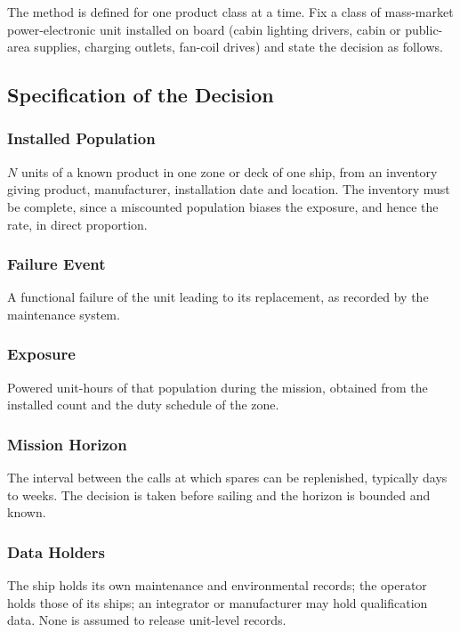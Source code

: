 The method is defined for one product class at a time. Fix a class of
mass-market power-electronic unit installed on board (cabin lighting drivers,
cabin or public-area supplies, charging outlets, fan-coil drives) and state
the decision as follows.

\subsection{Specification of the Decision}
\subsubsection{Installed Population}
$N$ units of a known product in one zone or deck of
one ship, from an inventory giving product, manufacturer, installation date and
location. The inventory must be complete, since a miscounted population biases the
exposure, and hence the rate, in direct proportion.

\subsubsection{Failure Event}
A functional failure of the unit leading to its
replacement, as recorded by the maintenance system.

\subsubsection{Exposure}
Powered unit-hours of that population during the mission,
obtained from the installed count and the duty schedule of the zone.

\subsubsection{Mission Horizon}
The interval between the calls at which spares can be
replenished, typically days to weeks. The decision is taken before sailing and
the horizon is bounded and known.

\subsubsection{Data Holders}
The ship holds its own maintenance and environmental
records; the operator holds those of its ships; an integrator or manufacturer
may hold qualification data. None is assumed to release unit-level records.

